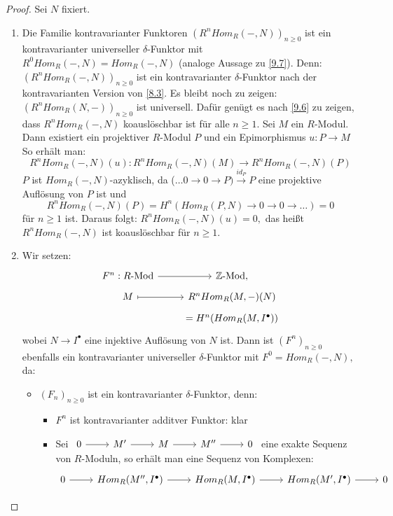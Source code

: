 \begin{proof}
	Sei $N$ fixiert. \\
	\begin{enumerate}
		\item Die Familie kontravarianter Funktoren $(R^{n}Hom_R(-,N))_{n \geq 0}$ ist ein kontravarianter universeller $\delta$-Funktor mit $ R^{0}Hom_R(-,N)= Hom_R(-,N)$ (analoge Aussage zu \ref{9.7}). Denn: $(R^{n}Hom_R(-,N))_{n \geq 0}$ ist ein  kontravarianter $\delta$-Funktor nach der kontravarianten Version von \ref{8.3}. Es bleibt noch zu zeigen: $(R^{n}Hom_R(N,-))_{n \geq 0}$ ist universell. Dafür genügt es nach \ref{9.6} zu zeigen, dass $R^{n}Hom_R(-,N)$ koauslöschbar ist für alle $n \geq 1$. Sei $M$ ein $R$-Modul. Dann existiert ein projektiver $R$-Modul $P$ und ein Epimorphismus $u: P \to M $
		So erhält man: $$R^{n}Hom_R(-,N)(u) : R^{n}Hom_R(-,N)(M) \to R^{n}Hom_R(-,N)(P)$$
		$P$ ist $Hom_R(-,N)$-azyklisch, da ($\dots 0 \to 0 \to P) \overset{id_P}{\longrightarrow} P $ eine projektive Auflösung von $P$ ist und $$R^{n}Hom_R(-,N)(P) =H^{n}(Hom_R(P,N) \to 0 \to 0 \to \dots ) =0$$ für $ n \geq 1$ ist. Daraus folgt: $R^{n}Hom_R(-,N)(u) = 0,$ das heißt $R^{n}Hom_R(-,N) $ ist koauslöschbar für $n \geq 1 $. 
		\item Wir setzen: 
		$$\begin{tikzcd}[row sep = tiny]
		F^{n}: R\text{-Mod} \arrow{r} & \Z\text{-Mod}, \\
		M \arrow[mapsto]{r}& R^{n}Hom_R(M,-)(N)\\ & = H^{n}(Hom_R(M,I^{\bullet}))
		\end{tikzcd}$$
		 wobei $N \to I^{\bullet} $ eine injektive Auflösung von $N$ ist. Dann ist $(F^{n})_{n \geq 0} $ ebenfalls ein kontravarianter universeller $\delta$-Funktor mit $F^{0} = Hom_R(-,N),$ da:
		 \begin{itemize}
		 	\item $(F_n)_{n \geq 0} $ ist ein kontravarianter $\delta$-Funktor, denn:
			\begin{itemize}
				\item $F^{n}$ ist kontravarianter additver Funktor: klar
				\item Sei $\begin{tikzcd}
				0\arrow{r} & M' \arrow{r} & M \arrow{r} & M'' \arrow{r} & 0
				\end{tikzcd}$ eine exakte Sequenz von $R$-Moduln, so erhält man eine Sequenz von Komplexen:$$\begin{tikzcd}
				0\arrow{r} & Hom_R(M'',I^{\bullet}) \arrow{r} & Hom_R(M,I^{\bullet})\arrow{r} & Hom_R(M', I^{\bullet}) \arrow{r} & 0

\end{tikzcd}$$
\end{itemize}
\end{itemize}
\end{enumerate}
\end{proof}
